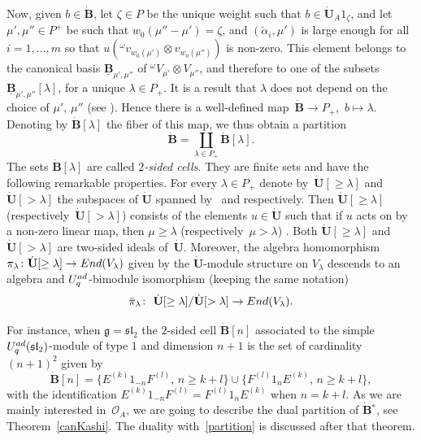\documentclass[11pt]{article}
\numberwithin{equation}{section}
\numberwithin{equation}{section}
\theoremstyle{definition}
\newcommand{\Oo}{{\mathcal O}}
\newcommand{\ra}{\rightarrow}
\begin{document}
Now, given $b\in \dot{\mathbf{B}}$, let $\zeta\in P$ be the unique weight such that $b \in \dot{\mathbf{U}}_A 1_\zeta$, and let ${\mu', \mu''\in P^+}$ be such that $w_0(\mu''-\mu')=\zeta$, and $(\check{\alpha}_i,\mu')$ is large enough for all $i=1,\dots,m$ so that $u({}^\omega v_{w_0(\mu')}\otimes v_{w_0(\mu'')})$ is non-zero. This element belongs to the canonical basis $\underline{\mathbf{B}}_{\mu',\mu''}$ of ${}^{\omega}V_{\mu'}\otimes V_{\mu''}$, and therefore to one of the subsets $\underline{\mathbf{B}}_{\mu',\mu''}[\lambda]$, for a unique $\lambda\in P_+$. It is a result that $\lambda$ does not depend on the choice of $\mu'$, $\mu''$ (see \cite[Section~29.1.1]{Lusztig}). Hence there is a well-defined map~${\dot{\mathbf{B}}\ra P_+}$,~$b\mapsto \lambda$. Denoting by $\dot{\mathbf{B}} [\lambda]$ the fiber of this map, we thus obtain a partition
\begin{equation}\label{partition} \dot{\mathbf{B}} = \coprod_{\lambda\in P_+}\dot{\mathbf{B}} [\lambda]. \end{equation}
The sets $\dot{\mathbf{B}} [\lambda]$ are called {\it $2$-sided cells}. They are finite sets and have the following remarkable properties. For every $\lambda\in P_+$ denote by~${\dot{\mathbf{U}} [\geq \lambda]}$ and $\dot{\mathbf{U}} [> \lambda]$ the subspaces of $\dot{\mathbf{U}}$ spanned by~ and  respectively. Then $\dot{\mathbf{U}} [\geq \lambda]$ (respectively~${\dot{\mathbf{U}} [> \lambda]}$) consists of the elements $u\in \dot{\mathbf{U}}$ such that if $u$ acts on  by a non-zero linear map, then $\mu\geq \lambda$ (respectively~${\mu> \lambda}$) \cite[Lemmas~29.1.3 and~29.1.4]{Lusztig}. Both $\dot{\mathbf{U}} [\geq \lambda]$ and $\dot{\mathbf{U}} [> \lambda]$ are two-sided ideals of~$\dot{\mathbf{U}}$. Moreover, the algebra homomorphism $\pi_\lambda\colon \dot{\mathbf{U}} [\geq\lambda] \ra {\rm End}(V_\lambda)$ given by the $\dot{\mathbf{U}}$-module structure on $V_\lambda$ descends to an algebra and $U_q^{\rm ad}$-bimodule isomorphism (keeping the same notation) \cite[Proposition~29.2.2]{Lusztig}
\begin{equation}\label{pimuiso} \bar{\pi}_\lambda\colon\ \dot{\mathbf{U}} [\geq \lambda]/ \dot{\mathbf{U}} [> \lambda] \ra {\rm End}(V_\lambda) . \end{equation}

For instance, when $\mathfrak{g}={\mathfrak{sl}_2}$ the $2$-sided cell $\dot{\mathbf{B}} [n]$ associated to the simple $U_q^{\rm ad}({\mathfrak{sl}_2})$-module of type $1$ and dimension $n+1$ is the set of cardinality $(n+1)^2$ given by \cite[Section~29.4.3]{Lusztig}
\begin{equation}\label{2sidedcellsl2}
\dot{\mathbf{B}} [n] =\big\{E^{(k)}1_{-n}F^{(l)},\,n\geq k+l \big\} \cup \big\{F^{(l)}1_nE^{(k)},\,n\geq k+l\big\},
\end{equation}
with the identification $E^{(k)}1_{-n}F^{(l)} = F^{(l)}1_nE^{(k)}$ when $n=k+l$. As we are mainly interested in~$\Oo_A$, we are going to describe the dual partition of $\dot{\mathbf{B}} {}^*$, see Theorem~\ref{canKashi}. The duality with~\eqref{partition} is discussed after that theorem.
\end{document}
